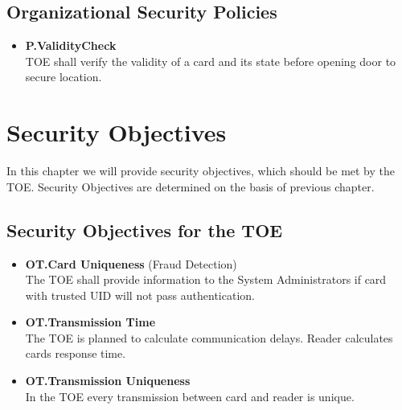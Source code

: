 \documentclass[10pt,titlepage]{article}
\begin{document}
\subsection{Organizational Security Policies}
\begin{itemize}
	\item \textbf{P.ValidityCheck} \\ TOE shall verify the validity of a card and its state before opening door to secure location.
\end{itemize}

\section{Security Objectives}

In this chapter we will provide security objectives, which should be met by the TOE. Security Objectives are determined on the basis of previous chapter.

\subsection{Security Objectives for the TOE}
\begin{itemize}
\item \textbf{OT.Card Uniqueness} (Fraud Detection) \\ The TOE shall provide information to the System Administrators if card with trusted UID will not pass authentication.
\item \textbf{OT.Transmission Time} \\The TOE is planned to calculate communication delays. Reader calculates cards response time.
\item \textbf{OT.Transmission Uniqueness} \\ In the TOE every transmission between card and reader is unique.
\end{itemize}
\end{document}
